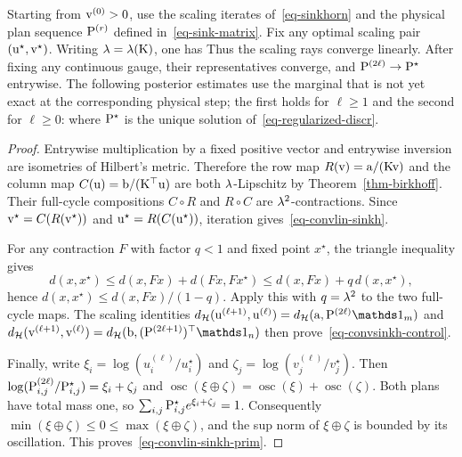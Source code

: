 \begin{thm}\label{thm-sinkhorn-hilbert-linear}
	Starting from $\vD^{(0)}>0$, use the scaling iterates of~\eqref{eq-sinkhorn} and the physical plan sequence $\P^{(r)}$ defined in~\eqref{eq-sink-matrix}. Fix any optimal scaling pair $(\uD^\star,\vD^\star)$.
	Writing $\la=\la(\K)$, one has
	Thus the scaling rays converge linearly. After fixing any continuous gauge, their representatives converge, and $\P^{(2\ell)}\to\P^\star$ entrywise. The following posterior estimates use the marginal that is not yet exact at the corresponding physical step; the first holds for $\ell\geq1$ and the second for $\ell\geq0$:
	where $\P^\star$ is the unique solution of~\eqref{eq-regularized-discr}.
\end{thm}

\begin{proof}
	Entrywise multiplication by a fixed positive vector and entrywise inversion are isometries of Hilbert's metric. Therefore the row map $R(\vD)=\a/(\K\vD)$ and the column map $C(\uD)=\b/(\K^\top\uD)$ are both $\la$-Lipschitz by Theorem~\ref{thm-birkhoff}. Their full-cycle compositions $C\circ R$ and $R\circ C$ are $\la^2$-contractions. Since $\vD^\star=C(R(\vD^\star))$ and $\uD^\star=R(C(\uD^\star))$, iteration gives~\eqref{eq-convlin-sinkh}.

	For any contraction $F$ with factor $q<1$ and fixed point $x^\star$, the triangle inequality gives
	\[
		d(x,x^\star)
		\leq
		d(x,Fx)+d(Fx,Fx^\star)
		\leq
		d(x,Fx)+q\,d(x,x^\star),
	\]
	hence $d(x,x^\star)\leq d(x,Fx)/(1-q)$. Apply this with $q=\la^2$ to the two full-cycle maps. The scaling identities
	\(
			\Hilbert(\uD^{(\ell+1)},\uD^{(\ell)})
			=\Hilbert(\a,\P^{(2\ell)}\ones_m)
	\)
	and
	\(
			\Hilbert(\vD^{(\ell+1)},\vD^{(\ell)})
			=\Hilbert(\b,(\P^{(2\ell+1)})^\top\ones_n)
	\)
	then prove~\eqref{eq-convsinkh-control}.

	Finally, write $\xi_i=\log(u_i^{(\ell)}/u_i^\star)$ and $\zeta_j=\log(v_j^{(\ell)}/v_j^\star)$. Then $\log(\P_{i,j}^{(2\ell)}/\P_{i,j}^\star)=\xi_i+\zeta_j$ and $\operatorname{osc}(\xi\oplus\zeta)=\operatorname{osc}(\xi)+\operatorname{osc}(\zeta)$.
	Both plans have total mass one, so $\sum_{i,j}\P_{i,j}^\star e^{\xi_i+\zeta_j}=1$. Consequently $\min(\xi\oplus\zeta)\leq0\leq\max(\xi\oplus\zeta)$, and the sup norm of $\xi\oplus\zeta$ is bounded by its oscillation. This proves~\eqref{eq-convlin-sinkh-prim}.
\end{proof}

